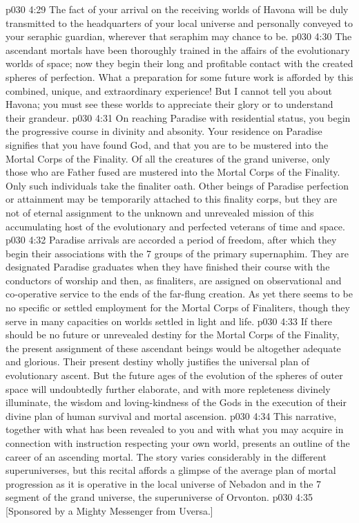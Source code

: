 \vs p030 4:29 The fact of your arrival on the receiving worlds of Havona will be duly transmitted to the headquarters of your local universe and personally conveyed to your seraphic guardian, wherever that seraphim may chance to be.
\vs p030 4:30 The ascendant mortals have been thoroughly trained in the affairs of the evolutionary worlds of space; now they begin their long and profitable contact with the created spheres of perfection. What a preparation for some future work is afforded by this combined, unique, and extraordinary experience! But I cannot tell you about Havona; you must see these worlds to appreciate their glory or to understand their grandeur.
\vs p030 4:31 \bibnobreakspace {} On reaching Paradise with residential status, you begin the progressive course in divinity and absonity. Your residence on Paradise signifies that you have found God, and that you are to be mustered into the Mortal Corps of the Finality. Of all the creatures of the grand universe, only those who are Father fused are mustered into the Mortal Corps of the Finality. Only such individuals take the finaliter oath. Other beings of Paradise perfection or attainment may be temporarily attached to this finality corps, but they are not of eternal assignment to the unknown and unrevealed mission of this accumulating host of the evolutionary and perfected veterans of time and space.
\vs p030 4:32 Paradise arrivals are accorded a period of freedom, after which they begin their associations with the 7 groups of the primary supernaphim. They are designated Paradise graduates when they have finished their course with the conductors of worship and then, as finaliters, are assigned on observational and co\hyp{}operative service to the ends of the far\hyp{}flung creation. As yet there seems to be no specific or settled employment for the Mortal Corps of Finaliters, though they serve in many capacities on worlds settled in light and life.
\vs p030 4:33 If there should be no future or unrevealed destiny for the Mortal Corps of the Finality, the present assignment of these ascendant beings would be altogether adequate and glorious. Their present destiny wholly justifies the universal plan of evolutionary ascent. But the future ages of the evolution of the spheres of outer space will undoubtedly further elaborate, and with more repleteness divinely illuminate, the wisdom and loving\hyp{}kindness of the Gods in the execution of their divine plan of human survival and mortal ascension.
\vs p030 4:34 \pc This narrative, together with what has been revealed to you and with what you may acquire in connection with instruction respecting your own world, presents an outline of the career of an ascending mortal. The story varies considerably in the different superuniverses, but this recital affords a glimpse of the average plan of mortal progression as it is operative in the local universe of Nebadon and in the 7 segment of the grand universe, the superuniverse of Orvonton.
\vsetoff
\vs p030 4:35 [Sponsored by a Mighty Messenger from Uversa.]
\quizlink
